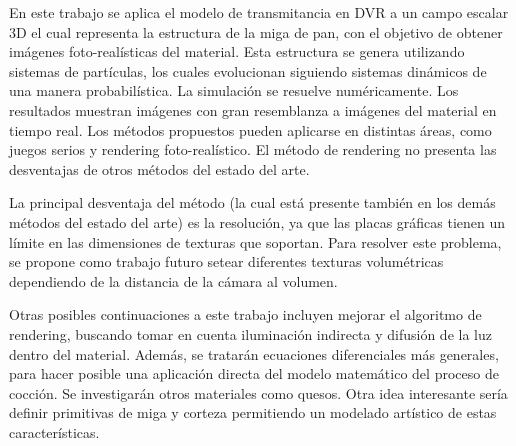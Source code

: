 \documentclass[oneside,a4paper,spanish,links]{amca}
\begin{document}
En este trabajo se aplica el modelo de transmitancia en DVR a un campo escalar 3D el cual representa la estructura de la miga de pan, con el objetivo de obtener im\'agenes foto-real\'isticas del material. Esta estructura se genera utilizando sistemas de part\'iculas, los cuales evolucionan siguiendo sistemas din\'amicos de una manera probabil\'istica. La simulaci\'on se resuelve num\'ericamente. Los resultados muestran im\'agenes con gran resemblanza a im\'agenes del material en tiempo real. Los m\'etodos propuestos pueden aplicarse en distintas \'areas, como juegos serios \citep{Susi2007} y rendering foto-real\'istico. El m\'etodo de rendering no presenta las desventajas de otros m\'etodos del estado del arte.

La principal desventaja del m\'etodo (la cual est\'a presente tambi\'en en los dem\'as m\'etodos del estado del arte) es la resoluci\'on, ya que las placas gr\'aficas tienen un l\'imite en las dimensiones de texturas que soportan. Para resolver este problema, se propone como trabajo futuro setear diferentes texturas volum\'etricas dependiendo de la distancia de la c\'amara al volumen.

Otras posibles continuaciones a este trabajo incluyen mejorar el algoritmo de rendering, buscando tomar en cuenta iluminaci\'on indirecta y difusión de la luz dentro del material. Adem\'as, se tratar\'an ecuaciones diferenciales m\'as generales, para hacer posible una aplicaci\'on directa del modelo matem\'atico del proceso de cocci\'on. Se investigar\'an otros materiales como quesos. Otra idea interesante ser\'ia definir primitivas de miga y corteza permitiendo un modelado art\'istico de estas caracter\'isticas. 

%

\end{document}
